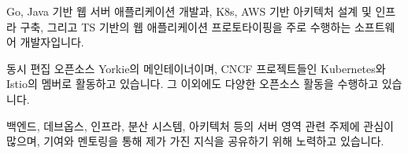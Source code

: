 

\begin{cvparagraph}

Go, Java 기반 웹 서버 애플리케이션 개발과, K8s, AWS 기반 아키텍처 설계 및 인프라 구축, 그리고 TS 기반의 웹 애플리케이션 프로토타이핑을 주로 수행하는 소프트웨어 개발자입니다.

동시 편집 오픈소스 Yorkie의 메인테이너이며, CNCF 프로젝트들인 Kubernetes와 Istio의 멤버로 활동하고 있습니다. 그 이외에도 다양한 오픈소스 활동을 수행하고 있습니다.

백엔드, 데브옵스, 인프라, 분산 시스템, 아키텍처 등의 서버 영역 관련 주제에 관심이 많으며, 기여와 멘토링을 통해 제가 가진 지식을 공유하기 위해 노력하고 있습니다.
\end{cvparagraph}
